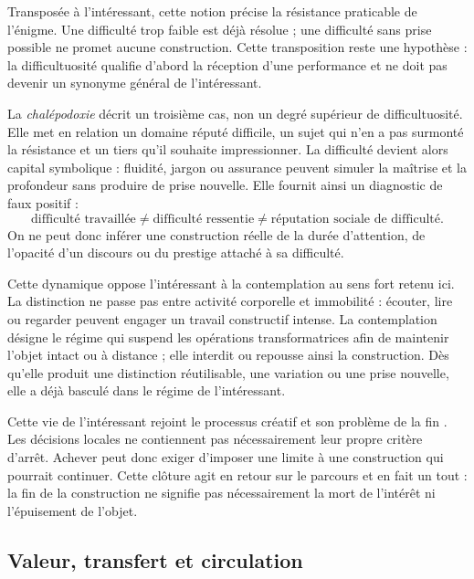 \documentclass[11pt,a4paper]{article}
\begin{document}
Transposée à l'intéressant, cette notion précise la résistance praticable de
l'énigme. Une difficulté trop faible est déjà résolue ; une difficulté sans
prise possible ne promet aucune construction. Cette transposition reste une
hypothèse : la difficultuosité qualifie d'abord la réception d'une performance
et ne doit pas devenir un synonyme général de l'intéressant.

La \emph{chalépodoxie} décrit un troisième cas, non un degré supérieur de
difficultuosité. Elle met en relation un domaine réputé difficile, un sujet qui
n'en a pas surmonté la résistance et un tiers qu'il souhaite impressionner. La
difficulté devient alors capital symbolique : fluidité, jargon ou assurance
peuvent simuler la maîtrise et la profondeur sans produire de prise nouvelle.
Elle fournit ainsi un diagnostic de faux positif :
\[
  \text{difficulté travaillée}
  \neq \text{difficulté ressentie}
  \neq \text{réputation sociale de difficulté}.
\]
On ne peut donc inférer une construction réelle de la durée d'attention, de
l'opacité d'un discours ou du prestige attaché à sa difficulté.

Cette dynamique oppose l'intéressant à la contemplation au sens fort retenu ici.
La distinction ne passe pas entre activité corporelle et immobilité : écouter,
lire ou regarder peuvent engager un travail constructif intense. La contemplation
désigne le régime qui suspend les opérations transformatrices afin de maintenir
l'objet intact ou à distance ; elle interdit ou repousse ainsi la construction.
Dès qu'elle produit une distinction réutilisable, une variation ou une prise
nouvelle, elle a déjà basculé dans le régime de l'intéressant.

Cette vie de l'intéressant rejoint le processus créatif et son problème de la
fin \parencite{pachet2026impossibilite}. Les décisions locales ne contiennent
pas nécessairement leur propre critère d'arrêt. Achever peut donc exiger
d'imposer une limite à une construction qui pourrait continuer. Cette clôture
agit en retour sur le parcours et en fait un tout : la fin de la
construction ne signifie pas nécessairement la mort de l'intérêt ni
l'épuisement de l'objet.

\subsection{Valeur, transfert et circulation}
\end{document}
